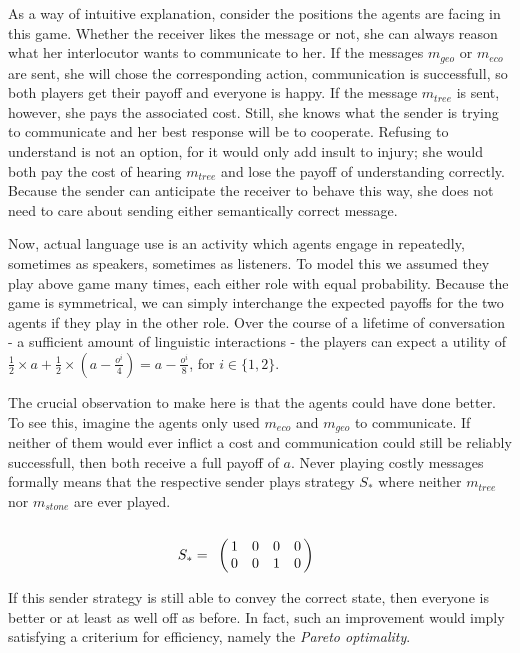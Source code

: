 \documentclass[10]{article}
\begin{document}
As a way of intuitive explanation, consider the positions the agents are facing in this game. Whether the receiver likes the message or not, she can always reason what her interlocutor wants to communicate to her. If the messages $m_{geo}$ or $m_{eco}$ are sent, she will chose the corresponding action, communication is successfull, so both players get their payoff and everyone is happy. If the message $m_{tree}$ is sent, however, she pays the associated cost. Still, she knows what the sender is trying to communicate and her best response will be to cooperate. Refusing to understand is not an option, for it would only add insult to injury; she would both pay the cost of hearing $m_{tree}$ and lose the payoff of understanding correctly. Because the sender can anticipate the receiver to behave this way, she does not need to care about sending either semantically correct message.

Now, actual language use is an activity which agents engage in repeatedly, sometimes as speakers, sometimes as listeners. To model this we assumed they play above game many times, each either role with equal probability. Because the game is symmetrical, we can simply interchange the expected payoffs for the two agents if they play in the other role. Over the course of a lifetime of conversation - a sufficient amount of linguistic interactions - the players can expect a utility of $\tfrac{1}{2}\times a + \tfrac{1}{2}\times (a-\tfrac{o^i}{4})=a-\tfrac{o^i}{8}$, for $i\in \{1,2\}$. 
 
The crucial observation to make here is that the agents could have done better. To see this, imagine the agents only used $m_{eco}$ and $m_{geo}$ to communicate. If neither of them would ever inflict a cost and communication could still be reliably successfull, then both receive a full payoff of $a$.
Never playing costly messages formally means that the respective sender plays strategy $S_*$ where neither $m_{tree}$ nor $m_{stone}$ are ever played. 
\begin{equation*}
S_*=
\bordermatrix{
            & & & &    \cr
 &       1 &    0      & 0       & 0 \cr
 &       0 &         0 & 1      & 0
 }\qquad
\end{equation*}

If this sender strategy is still able to convey the correct state, then everyone is better or at least as well off as before. In fact, such an improvement would imply satisfying a criterium for efficiency, namely the  \textit{Pareto optimality}.
\end{document}
